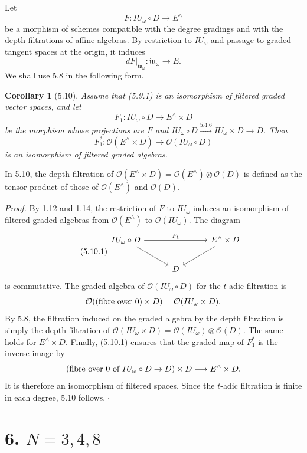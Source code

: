 \documentclass[10pt,a4paper]{article}
\newcommand{\OO}{\mathcal O}
\theoremstyle{deligne}
\newtheorem*{corollary*}{Corollary}
\newenvironment{proofdel}{\textit{Proof.}}{\hfill$\square$}
\begin{document}
Let
\[
F:IU_\omega\circ D\longrightarrow E^\wedge
\]
be a morphism of schemes compatible with the degree gradings and with the depth filtrations of affine algebras. By restriction to \(IU_\omega\) and passage to graded tangent spaces at the origin, it induces
\[
\tag{5.9.1}
dF|_{\mathfrak{iu}_\omega}:\mathfrak{iu}_\omega\longrightarrow E.
\]
We shall use 5.8 in the following form.

\begin{corollary*}[5.10]
Assume that (5.9.1) is an isomorphism of filtered graded vector spaces, and let
\[
F_1:IU_\omega\circ D\longrightarrow E^\wedge\times D
\]
be the morphism whose projections are \(F\) and \(IU_\omega\circ D\xrightarrow{5.4.6}IU_\omega\times D\to D\). Then
\[
F_1^*:\OO(E^\wedge\times D)\longrightarrow\OO(IU_\omega\circ D)
\]
is an isomorphism of filtered graded algebras.
\end{corollary*}

In 5.10, the depth filtration of \(\OO(E^\wedge\times D)=\OO(E^\wedge)\otimes\OO(D)\) is defined as the tensor product of those of \(\OO(E^\wedge)\) and \(\OO(D)\).

\begin{proofdel}
By 1.12 and 1.14, the restriction of \(F\) to \(IU_\omega\) induces an isomorphism of filtered graded algebras from \(\OO(E^\wedge)\) to \(\OO(IU_\omega)\). The diagram
\[
\tag{5.10.1}
\begin{tikzcd}[column sep=3.0em,row sep=2.0em]
IU_\omega\circ D \arrow[rr,"F_1"] \arrow[dr] &&
E^\wedge\times D \arrow[dl]\\
& D &
\end{tikzcd}
\]
is commutative. The graded algebra of \(\OO(IU_\omega\circ D)\) for the \(t\)-adic filtration is
\[
\OO((\hbox{fibre over }0)\times D)=\OO(IU_\omega\times D).
\]
By 5.8, the filtration induced on the graded algebra by the depth filtration is simply the depth filtration of \(\OO(IU_\omega\times D)=\OO(IU_\omega)\otimes\OO(D)\). The same holds for \(E^\wedge\times D\). Finally, (5.10.1) ensures that the graded map of \(F_1^*\) is the inverse image by
\[
(\hbox{fibre over }0\hbox{ of }IU_\omega\circ D\to D)\times D
\longrightarrow E^\wedge\times D.
\]
It is therefore an isomorphism of filtered spaces. Since the \(t\)-adic filtration is finite in each degree, 5.10 follows.
\end{proofdel}

\section*{6. \(N=3,4,8\)}
\end{document}
